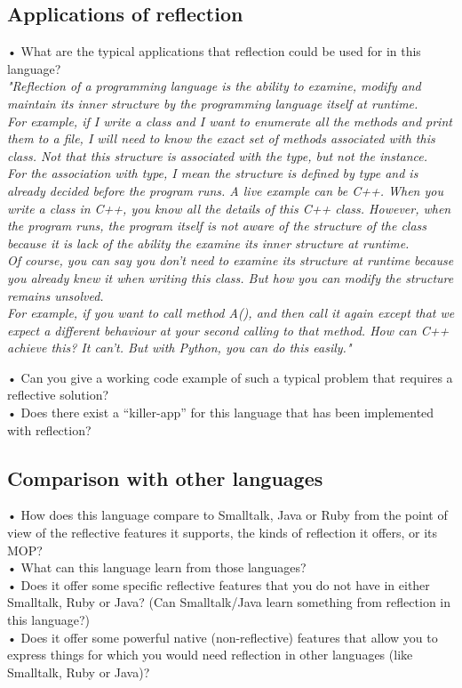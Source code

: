 \subsection{Applications of reflection}
•	What are the typical applications that reflection could be used for in this language?\\

\emph{"Reflection of a programming language is the ability to examine, modify and maintain its inner structure by the programming language itself at runtime.\\
For example, if I write a class and I want to enumerate all the methods and print them to a file, I will need to know the exact set of methods associated with this class. Not that this structure is associated with the type, but not the instance.\\ For the association with type, I mean the structure is defined by type and is already decided before the program runs. A live example can be C++. When you write a class in C++, you know all the details of this C++ class. However, when the program runs, the program itself is not aware of the structure of the class because it is lack of the ability the examine its inner structure at runtime.\\
Of course, you can say you don’t need to examine its structure at runtime because you already knew it when writing this class. But how you can modify the structure remains unsolved.\\
For example, if you want to call method A(), and then call it again except that we expect a different behaviour at your second calling to that method. How can C++ achieve this? It can’t. But with Python, you can do this easily."} \cite{assembleforce}

•	Can you give a working code example of such a typical problem that requires a reflective solution?\\







•	Does there exist a “killer-app” for this language that has been implemented with reflection?\\

\subsection{Comparison with other languages}
•	How does this language compare to Smalltalk, Java or Ruby from the point of view of the reflective features it supports, the kinds of reflection it offers, or its MOP?\\
•	What can this language learn from those languages?\\
•	Does it offer some specific reflective features that you do not have in either Smalltalk, Ruby or Java? (Can Smalltalk/Java learn something from reflection in this language?)\\
•	Does it offer some powerful native (non-reflective) features that allow you to express things for which you would need reflection in other languages (like Smalltalk, Ruby or Java)?\\
